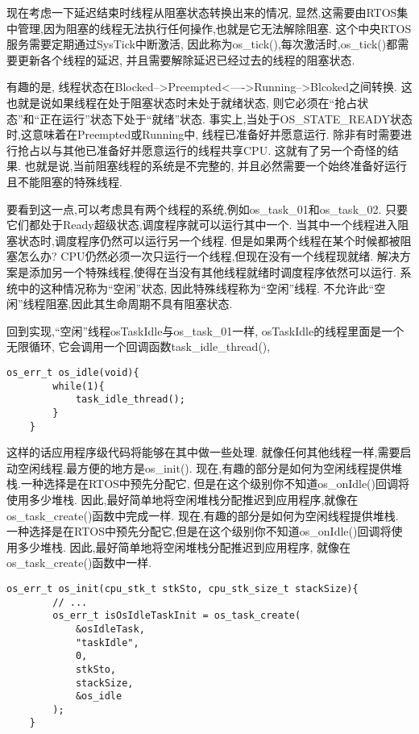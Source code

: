 现在考虑一下延迟结束时线程从阻塞状态转换出来的情况,
显然,这需要由RTOS集中管理,因为阻塞的线程无法执行任何操作,也就是它无法解除阻塞.
这个中央RTOS服务需要定期通过SysTick中断激活,
因此称为os\_tick(),每次激活时,os\_tick()都需要更新各个线程的延迟,
并且需要解除延迟已经过去的线程的阻塞状态.

有趣的是,
线程状态在Blocked-->Preempted<---->Running-->Blcoked之间转换.
这也就是说如果线程在处于阻塞状态时未处于就绪状态,
则它必须在“抢占状态”和“正在运行”状态下处于“就绪”状态.
事实上,当处于OS\_STATE\_READY状态时,这意味着在Preempted或Running中,
线程已准备好并愿意运行.
除非有时需要进行抢占以与其他已准备好并愿意运行的线程共享CPU.
这就有了另一个奇怪的结果.
也就是说,当前阻塞线程的系统是不完整的,
并且必然需要一个始终准备好运行且不能阻塞的特殊线程.

要看到这一点,可以考虑具有两个线程的系统,例如os\_task\_01和os\_task\_02.
只要它们都处于Ready超级状态,调度程序就可以运行其中一个.
当其中一个线程进入阻塞状态时,调度程序仍然可以运行另一个线程.
但是如果两个线程在某个时候都被阻塞怎么办? 
CPU仍然必须一次只运行一个线程,但现在没有一个线程现就绪.
解决方案是添加另一个特殊线程,使得在当没有其他线程就绪时调度程序依然可以运行.
系统中的这种情况称为“空闲”状态,
因此特殊线程称为“空闲”线程.
不允许此“空闲”线程阻塞,因此其生命周期不具有阻塞状态.

回到实现,“空闲”线程osTaskIdle与os\_task\_01一样,
osTaskIdle的线程里面是一个无限循环,
它会调用一个回调函数task\_idle\_thread(),
\begin{lstlisting}[language={[ANSI]C},keywordstyle=\color{blue!70},commentstyle=\color{red!50!green!50!blue!50},frame=shadowbox, rulesepcolor=\color{red!20!green!20!blue!20}]
    os_err_t os_idle(void){
	    while(1){
		    task_idle_thread();
	    }
    }
\end{lstlisting}
这样的话应用程序级代码将能够在其中做一些处理.
就像任何其他线程一样,需要启动空闲线程.最方便的地方是os\_init().
现在,有趣的部分是如何为空闲线程提供堆栈.一种选择是在RTOS中预先分配它,
但是在这个级别你不知道os\_onIdle()回调将使用多少堆栈.
因此,最好简单地将空闲堆栈分配推迟到应用程序,就像在os\_task\_create()函数中完成一样.
现在,有趣的部分是如何为空闲线程提供堆栈.
一种选择是在RTOS中预先分配它,但是在这个级别你不知道os\_onIdle()回调将使用多少堆栈.
因此,最好简单地将空闲堆栈分配推迟到应用程序,
就像在os\_task\_create()函数中一样.
\begin{lstlisting}[language={[ANSI]C},keywordstyle=\color{blue!70},commentstyle=\color{red!50!green!50!blue!50},frame=shadowbox, rulesepcolor=\color{red!20!green!20!blue!20}]
    os_err_t os_init(cpu_stk_t stkSto, cpu_stk_size_t stackSize){
        // ...
        os_err_t isOsIdleTaskInit = os_task_create(
            &osIdleTask,
            "taskIdle",
            0,
            stkSto,
            stackSize,
            &os_idle
        );
    }
\end{lstlisting}

